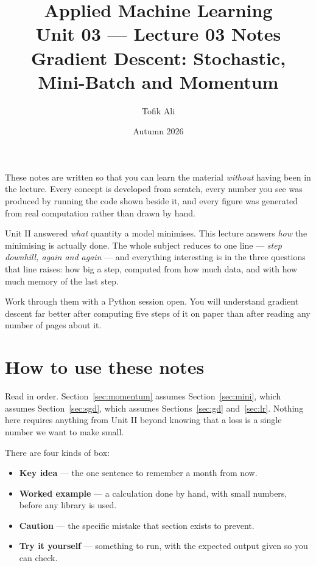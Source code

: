 \documentclass[11pt]{article}
\title{Applied Machine Learning\\Unit 03 --- Lecture 03 Notes\\
       Gradient Descent: Stochastic, Mini-Batch and Momentum}
\author{Tofik Ali}
\date{Autumn 2026}
\begin{document}
\maketitle

\begin{keyidea}
These notes are written so that you can learn the material \emph{without}
having been in the lecture. Every concept is developed from scratch, every
number you see was produced by running the code shown beside it, and every
figure was generated from real computation rather than drawn by hand.

Unit II answered \emph{what} quantity a model minimises. This lecture answers
\emph{how} the minimising is actually done. The whole subject reduces to one
line --- \emph{step downhill, again and again} --- and everything interesting
is in the three questions that line raises: how big a step, computed from how
much data, and with how much memory of the last step.

Work through them with a Python session open. You will understand gradient
descent far better after computing five steps of it on paper than after reading
any number of pages about it.
\end{keyidea}

\tableofcontents
\newpage

\section{How to use these notes}
\label{sec:how}

Read in order. Section~\ref{sec:momentum} assumes Section~\ref{sec:mini}, which
assumes Section~\ref{sec:sgd}, which assumes Sections~\ref{sec:gd}
and~\ref{sec:lr}. Nothing here requires anything from Unit II beyond knowing
that a loss is a single number we want to make small.

There are four kinds of box:

\begin{itemize}[leftmargin=*]
  \item \textbf{Key idea} --- the one sentence to remember a month from now.
  \item \textbf{Worked example} --- a calculation done by hand, with small
    numbers, before any library is used.
  \item \textbf{Caution} --- the specific mistake that section exists to prevent.
  \item \textbf{Try it yourself} --- something to run, with the expected output
    given so you can check.
\end{itemize}
\end{document}
